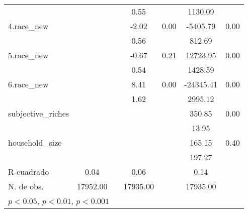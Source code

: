 {\begin{tabular}{l*{3}{cc}}
            &                     &            &        0.55         &            &     1130.09         &            \\
4.race\_new  &                     &            &       -2.02\sym{***}&        0.00&    -5405.79\sym{***}&        0.00\\
            &                     &            &        0.56         &            &      812.69         &            \\
5.race\_new  &                     &            &       -0.67         &        0.21&    12723.95\sym{***}&        0.00\\
            &                     &            &        0.54         &            &     1428.59         &            \\
6.race\_new  &                     &            &        8.41\sym{***}&        0.00&   -24345.41\sym{***}&        0.00\\
            &                     &            &        1.62         &            &     2995.12         &            \\
subjective\_riches&                     &            &                     &            &      350.85\sym{***}&        0.00\\
            &                     &            &                     &            &       13.95         &            \\
household\_size&                     &            &                     &            &      165.15         &        0.40\\
            &                     &            &                     &            &      197.27         &            \\
\hline
R-cuadrado  &        0.04         &            &        0.06         &            &        0.14         &            \\
N. de obs.  &    17952.00         &            &    17935.00         &            &    17935.00         &            \\
\hline\hline
\multicolumn{7}{l}{\footnotesize \sym{*} \(p<0.05\), \sym{**} \(p<0.01\), \sym{***} \(p<0.001\)}\\
\end{tabular}
}
